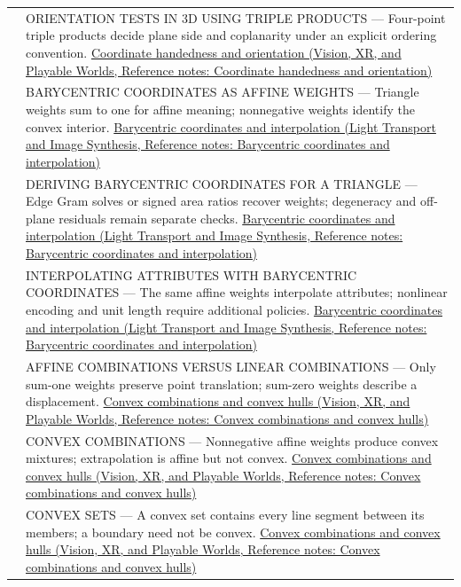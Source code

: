 {\begin{longtable}[]{@{}
  >{\raggedright\arraybackslash}p{}
  >{\raggedright\arraybackslash}p{}@{}}
567 & ORIENTATION TESTS IN 3D USING TRIPLE PRODUCTS --- Four-point triple products decide plane side and coplanarity under an explicit ordering convention. \href{../07-Vision-XR-and-Playable-Worlds/main.pdf\#nameddest=appendix-87d7626c8d37}{Coordinate handedness and orientation (Vision, XR, and Playable Worlds, Reference notes: Coordinate handedness and orientation)} \\
568 & BARYCENTRIC COORDINATES AS AFFINE WEIGHTS --- Triangle weights sum to one for affine meaning; nonnegative weights identify the convex interior. \href{../04-Light-Transport-and-Image-Synthesis/main.pdf\#nameddest=appendix-02b9d9a81dca}{Barycentric coordinates and interpolation (Light Transport and Image Synthesis, Reference notes: Barycentric coordinates and interpolation)} \\
569 & DERIVING BARYCENTRIC COORDINATES FOR A TRIANGLE --- Edge Gram solves or signed area ratios recover weights; degeneracy and off-plane residuals remain separate checks. \href{../04-Light-Transport-and-Image-Synthesis/main.pdf\#nameddest=appendix-02b9d9a81dca}{Barycentric coordinates and interpolation (Light Transport and Image Synthesis, Reference notes: Barycentric coordinates and interpolation)} \\
570 & INTERPOLATING ATTRIBUTES WITH BARYCENTRIC COORDINATES --- The same affine weights interpolate attributes; nonlinear encoding and unit length require additional policies. \href{../04-Light-Transport-and-Image-Synthesis/main.pdf\#nameddest=appendix-02b9d9a81dca}{Barycentric coordinates and interpolation (Light Transport and Image Synthesis, Reference notes: Barycentric coordinates and interpolation)} \\
571 & AFFINE COMBINATIONS VERSUS LINEAR COMBINATIONS --- Only sum-one weights preserve point translation; sum-zero weights describe a displacement. \href{../07-Vision-XR-and-Playable-Worlds/main.pdf\#nameddest=appendix-0026ec42c9d5}{Convex combinations and convex hulls (Vision, XR, and Playable Worlds, Reference notes: Convex combinations and convex hulls)} \\
572 & CONVEX COMBINATIONS --- Nonnegative affine weights produce convex mixtures; extrapolation is affine but not convex. \href{../07-Vision-XR-and-Playable-Worlds/main.pdf\#nameddest=appendix-0026ec42c9d5}{Convex combinations and convex hulls (Vision, XR, and Playable Worlds, Reference notes: Convex combinations and convex hulls)} \\
573 & CONVEX SETS --- A convex set contains every line segment between its members; a boundary need not be convex. \href{../07-Vision-XR-and-Playable-Worlds/main.pdf\#nameddest=appendix-0026ec42c9d5}{Convex combinations and convex hulls (Vision, XR, and Playable Worlds, Reference notes: Convex combinations and convex hulls)} \\

\end{longtable}}
